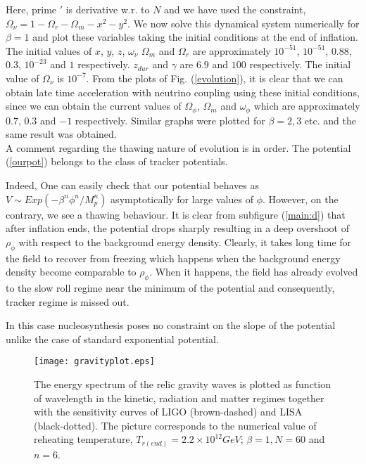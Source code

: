 \documentclass[prd,twocolumn,superscriptaddress]{revtex4}
\begin{document}
Here, prime $'$ is derivative w.r. to $N$ and we have used the constraint, $\Omega_{\nu} = 1 - \Omega_r - \Omega_m - x^2 - y^2$.
 We now solve this dynamical system numerically for $\beta = 1$ and plot
these variables taking the initial conditions at the end of inflation. The initial values of $x$, $y$, $z$, $\omega_{\nu}$ $\Omega_m$ and
$\Omega_r$ are approximately $10^{-51}$, $10^{-51}$, $0.88$, $0.3$, $10^{-23}$ and $1$ respectively. $z_{dur}$ 
and $\gamma$ are $6.9$ and $100$ respectively. The initial value of $\Omega_{\nu}$ is $10^{-7}$. From the plots of
Fig. (\ref{evolution}), it is clear that we can obtain late time acceleration with neutrino coupling  using
these initial conditions, since we  can obtain the current values of $\Omega_{\phi}$, $\Omega_m$ and $\omega_{\phi}$ which
are approximately $0.7$, $0.3$ and $-1$ respectively. Similar graphs were plotted for   $\beta=2,3$ etc. and the same result was obtained. \\
A comment regarding the thawing nature of evolution is in order. The potential (\ref{ourpot}) belongs to the 
class of tracker potentials. 

Indeed, One can easily check that our potential behaves as $V \sim Exp(-\beta^n \phi^n/M^n_p)$ \cite{Geng:2017mic} asymptotically 
for large values of  $\phi$. However, on the contrary, we see a thawing
behaviour. It is clear from subfigure (\ref{main:d}) that after inflation ends, the potential drops sharply
resulting in a deep overshoot of $\rho_{\phi}$ with respect to the background energy density. 
Clearly, it takes long time for the field to recover from 
freezing which happens when the background energy density become comparable to $\rho_{\phi}$. When it happens, the 
field has already evolved to the slow roll regime near the minimum of the potential and consequently,
  tracker regime is missed out. 
  
  In this case nucleosynthesis poses no constraint on the slope of the potential unlike the case of standard exponential potential.
\begin{figure}
  \centering
 \texttt{[image: gravityplot.eps]} 
  \caption{The energy spectrum of the relic gravity waves is plotted as function of wavelength in the kinetic, radiation 
  and matter regimes together with the sensitivity curves of LIGO (brown-dashed) and LISA (black-dotted). The picture corresponds to the numerical value of reheating temperature, $T_{r(end)}=2.2\times 10^{12}GeV$; $\beta=1, N=60$ and $n=6$.}
  \label{lisaligo}
 \end{figure}
\end{document}
